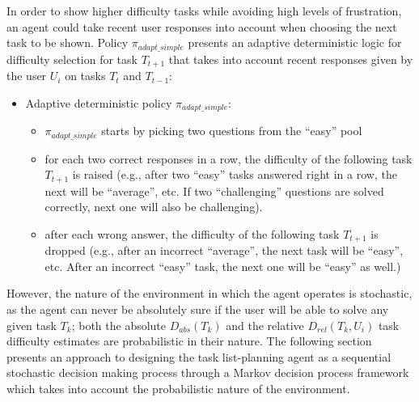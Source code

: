 In order to show higher difficulty tasks while avoiding high levels of frustration, an agent could take recent user responses into account when choosing the next task to be shown.
Policy $\pi_{adapt\_simple}$ presents an adaptive deterministic logic for difficulty selection for task $T_{t+1}$ that takes into account recent responses given by the user $U_i$ on tasks $T_t$ and $T_{t-1}$:

\begin{itemize}
    \item Adaptive deterministic policy $\pi_{adapt\_simple}$:
    \begin{itemize}
        \item $\pi_{adapt\_simple}$ starts by picking two questions from the ``easy'' pool
        \item for each two correct responses in a row, the difficulty of the following task $T_{t+1}$ is raised (e.g., after two ``easy'' tasks answered right in a row, the next will be ``average'', etc.
        If two ``challenging'' questions are solved correctly, next one will also be challenging).
        \item after each wrong answer, the difficulty of the following task $T_{t+1}$ is dropped (e.g., after an incorrect ``average'', the next task will be ``easy'', etc.
        After an incorrect ``easy'' task, the next one will be ``easy'' as well.)
    \end{itemize}
\end{itemize}

However, the nature of the environment in which the agent operates is stochastic, as the agent can never be absolutely sure if the user will be able to solve any given task $T_k$;
both the absolute $D_{abs}(T_k)$ and the relative $D_{rel}(T_k, U_i)$ task difficulty estimates are probabilistic in their nature.
The following section presents an approach to designing the task list-planning agent as a sequential stochastic decision making process through a Markov decision process framework which takes into account the probabilistic nature of the environment.